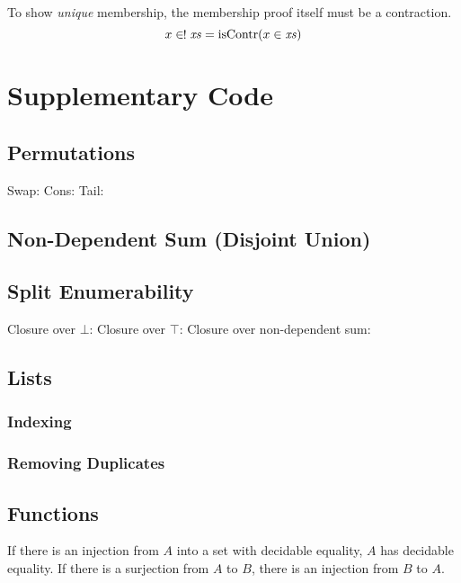 \begin{subappendices}
To show \emph{unique} membership, the membership proof itself must be a
contraction.
\begin{equation}
  x \inunique \mathit{xs} = \text{isContr}(x \in \mathit{xs})
\end{equation}
\section{Supplementary Code}
\subsection{Permutations}
Swap:
Cons:
Tail:
\subsection{Non-Dependent Sum (Disjoint Union)}
\subsection{Split Enumerability}
Closure over \(\bot\):
Closure over \(\top\):
Closure over non-dependent sum:
\subsection{Lists}
\subsubsection{Indexing}
\subsubsection{Removing Duplicates}
\subsection{Functions}
If there is an injection from \(A\) into a set with decidable equality, \(A\)
has decidable equality.
If there is a surjection from \(A\) to \(B\), there is an injection from \(B\)
to \(A\).

\end{subappendices}
